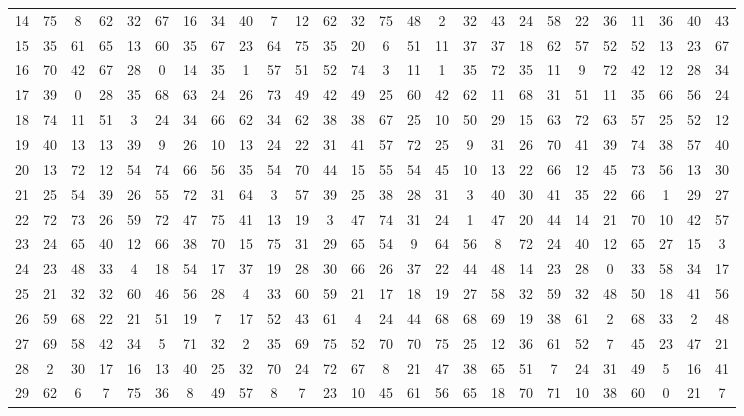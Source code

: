 \begin{table}
\begin{tabular}{c c c c c c c c c c c c c c c c c c c c c c c c c c }
14 & 75 & 8 & 62 & 32 & 67 & 16 & 34 & 40 & 7 & 12 & 62 & 32 & 75 & 48 & 2 & 32 & 43 & 24 & 58 & 22 & 36 & 11 & 36 & 40 & 43 \\
15 & 35 & 61 & 65 & 13 & 60 & 35 & 67 & 23 & 64 & 75 & 35 & 20 & 6 & 51 & 11 & 37 & 37 & 18 & 62 & 57 & 52 & 52 & 13 & 23 & 67 \\
16 & 70 & 42 & 67 & 28 & 0 & 14 & 35 & 1 & 57 & 51 & 52 & 74 & 3 & 11 & 1 & 35 & 72 & 35 & 11 & 9 & 72 & 42 & 12 & 28 & 34 \\
17 & 39 & 0 & 28 & 35 & 68 & 63 & 24 & 26 & 73 & 49 & 42 & 49 & 25 & 60 & 42 & 62 & 11 & 68 & 31 & 51 & 11 & 35 & 66 & 56 & 24 \\
18 & 74 & 11 & 51 & 3 & 24 & 34 & 66 & 62 & 34 & 62 & 38 & 38 & 67 & 25 & 10 & 50 & 29 & 15 & 63 & 72 & 63 & 57 & 25 & 52 & 12 \\
19 & 40 & 13 & 13 & 39 & 9 & 26 & 10 & 13 & 24 & 22 & 31 & 41 & 57 & 72 & 25 & 9 & 31 & 26 & 70 & 41 & 39 & 74 & 38 & 57 & 40 \\
20 & 13 & 72 & 12 & 54 & 74 & 66 & 56 & 35 & 54 & 70 & 44 & 15 & 55 & 54 & 45 & 10 & 13 & 22 & 66 & 12 & 45 & 73 & 56 & 13 & 30 \\
21 & 25 & 54 & 39 & 26 & 55 & 72 & 31 & 64 & 3 & 57 & 39 & 25 & 38 & 28 & 31 & 3 & 40 & 30 & 41 & 35 & 22 & 66 & 1 & 29 & 27 \\
22 & 72 & 73 & 26 & 59 & 72 & 47 & 75 & 41 & 13 & 19 & 3 & 47 & 74 & 31 & 24 & 1 & 47 & 20 & 44 & 14 & 21 & 70 & 10 & 42 & 57 \\
23 & 24 & 65 & 40 & 12 & 66 & 38 & 70 & 15 & 75 & 31 & 29 & 65 & 54 & 9 & 64 & 56 & 8 & 72 & 24 & 40 & 12 & 65 & 27 & 15 & 3 \\
24 & 23 & 48 & 33 & 4 & 18 & 54 & 17 & 37 & 19 & 28 & 30 & 66 & 26 & 37 & 22 & 44 & 48 & 14 & 23 & 28 & 0 & 33 & 58 & 34 & 17 \\
25 & 21 & 32 & 32 & 60 & 46 & 56 & 28 & 4 & 33 & 60 & 59 & 21 & 17 & 18 & 19 & 27 & 58 & 32 & 59 & 32 & 48 & 50 & 18 & 41 & 56 \\
26 & 59 & 68 & 22 & 21 & 51 & 19 & 7 & 17 & 52 & 43 & 61 & 4 & 24 & 44 & 68 & 68 & 69 & 19 & 38 & 61 & 2 & 68 & 33 & 2 & 48 \\
27 & 69 & 58 & 42 & 34 & 5 & 71 & 32 & 2 & 35 & 69 & 75 & 52 & 70 & 70 & 75 & 25 & 12 & 36 & 61 & 52 & 7 & 45 & 23 & 47 & 21 \\
28 & 2 & 30 & 17 & 16 & 13 & 40 & 25 & 32 & 70 & 24 & 72 & 67 & 8 & 21 & 47 & 38 & 65 & 51 & 7 & 24 & 31 & 49 & 5 & 16 & 41 \\
29 & 62 & 6 & 7 & 75 & 36 & 8 & 49 & 57 & 8 & 7 & 23 & 10 & 45 & 61 & 56 & 65 & 18 & 70 & 71 & 10 & 38 & 60 & 0 & 21 & 7 \\

\end{tabular}
\end{table}
